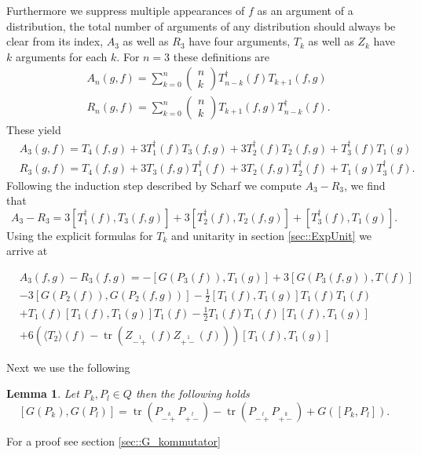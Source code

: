\documentclass[oneside,reqno,12pt]{amsart}
\newtheorem{Lemma}[Def]{Lemma}
\DeclareMathOperator{\tr}{tr}
\newcommand{\Z}[2]{Z_{\stackrel{1}{#1}}\left(#2\right)}
\begin{document}
Furthermore we suppress multiple appearances of \(f\) as an argument of a distribution, the total number of arguments of any distribution should always be clear from its index, \(A_3\) as well as \(R_3\) have four arguments, \(T_k\) as well as \(Z_k\) have \(k\) arguments for each \(k\). For \(n=3\) these definitions are
\begin{align}
&A_n(g,f)= \sum_{k=0}^n \begin{pmatrix}n\\k\end{pmatrix} T^\dagger_{n-k}(f) T_{k+1}(f,g)\\
&R_n(g,f)= \sum_{k=0}^n \begin{pmatrix}n\\k\end{pmatrix}  T_{k+1}(f,g) T^\dagger_{n-k}(f)
.\end{align}
These yield
\begin{align}
&A_3(g,f)= T_4(f,g)+3 T_1^\dagger(f)T_3(f,g)+3T_2^\dagger(f)T_2(f,g)+T_3^\dagger(f)T_1(g)\\
&R_3(g,f)= T_4(f,g)+3 T_3(f,g)T_1^\dagger(f)+3T_2(f,g)T_2^\dagger(f)+T_1(g)T_3^\dagger(f)
.\end{align}
Following the induction step described by Scharf we compute \(A_3-R_3\), we find that
\begin{equation}\label{commutator_first}
A_3-R_3=3 \left[T_1^\dagger(f),T_3(f,g) \right]+3\left[T_2^\dagger(f),T_2(f,g)\right]+\left[T_3^\dagger(f),T_1(g)\right]
.\end{equation}
Using the explicit formulas for \(T_k\) and unitarity in section \ref{sec::ExpUnit} we arrive at

\begin{align}\tag*{}
&A_3(f,g)-R_3(f,g)=- \left[ G(P_3(f)),T_1(g)\right] 
+ 3\left[ G(P_3(f,g)),T(f)\right]\\\tag*{}
&-3\left[G(P_2(f)),G(P_2(f,g))\right]
-\frac{1}{2} \left[T_1(f),T_1(g)\right] T_1(f) T_1(f)\\\tag*{}
&+ T_1(f) \left[T_1(f),T_1(g)\right] T_1(f)
-\frac{1}{2} T_1(f)T_1(f) \left[T_1(f),T_1(g)\right]\\
&+6 \left( \langle T_2\rangle(f) -\tr \left(\Z{-+}{f}\Z{+-}{f}\right)\right) \left[T_1(f),T_1(g)\right]
\end{align}

Next we use the following 
\begin{Lemma}\label{G_kommutator}
Let \(P_k,P_l\in Q\) then the following holds
\begin{equation}
\left[G(P_k),G(P_l)\right]= 
\tr\left(P_{\stackrel{k}{-+}}P_{\stackrel{l}{+-}}\right)
-\tr\left(P_{\stackrel{l}{-+}}P_{\stackrel{k}{+-}}\right) 
+G\left(\left[P_k,P_l\right]\right)
.\end{equation}
\end{Lemma}
For a proof see section \ref{sec::G_kommutator}
\end{document}
